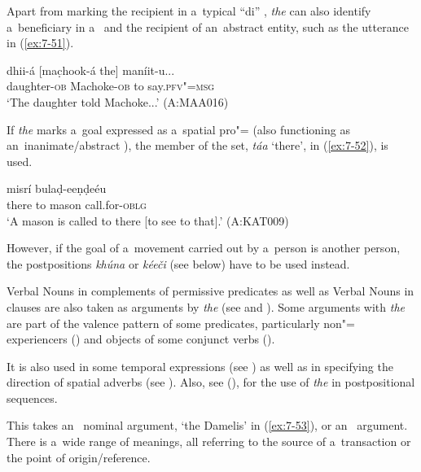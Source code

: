 Apart from marking the recipient in a~typical ``di'' , \textit{the} can also identify a~beneficiary in a~  and the recipient of an~abstract entity, such as the utterance in (\ref{ex:7-51}). 

\begin{exe}
\ex
\label{ex:7-51}
\gll dhii-á [mac̣hook-á the] maníit-u... \\
daughter-\textsc{ob} Machoke-\textsc{ob} to say.\textsc{pfv"=msg} \\
\glt `The daughter told Machoke...' (A:MAA016)
\end{exe}

If \textit{the} marks a~goal expressed as a~spatial pro"= (also functioning as an~inanimate/abstract  ), the  member of the set, \textit{táa} `there', in (\ref{ex:7-52}), is used.

\begin{exe}
\ex
\label{ex:7-52}
 misrí bulaḍ-eeṇḍeéu \\
there to mason call.for-\textsc{oblg}\\
\glt `A mason is called to there [to see to that].' (A:KAT009)
\end{exe}

However, if the goal of a~movement carried out by a~person is another person, the postpositions \textit{khúna} or \textit{kéeči} (see below) have to be used instead.


Verbal Nouns in complements of permissive predicates as well as Verbal Nouns in  clauses are also taken as arguments by \textit{the} (see  and ). Some arguments with \textit{the} are part of the valence pattern of some predicates, particularly non"= experiencers () and objects of some conjunct verbs (). 


It is also used in some temporal expressions (see ) as well as in specifying the direction of spatial adverbs (see ). Also, see (), for the use of \textit{the} in postpositional sequences. 


 This  takes an~ nominal argument, `the Damelis' in (\ref{ex:7-53}), or an~  argument. There is a~wide range of meanings, all referring to the source of a~transaction or the point of origin/reference.

